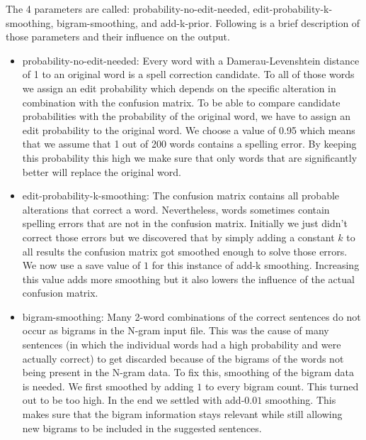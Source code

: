 \documentclass[11pt,a4paper]{article}
\begin{document}
The 4 parameters are called: probability-no-edit-needed, edit-probability-k-smoothing, bigram-smoothing, and add-k-prior. Following is a brief description of those parameters and their influence on the output.
\begin{itemize}
\item probability-no-edit-needed: Every word with a Damerau-Levenshtein distance of 1 to an original word is a spell correction candidate. To all of those words we assign an edit probability which depends on the specific alteration in combination with the confusion matrix. To be able to compare candidate probabilities with the probability of the original word, we have to assign an edit probability to the original word. We choose a value of 0.95 which means that we assume that 1 out of 200 words contains a spelling error. By keeping this probability this high we make sure that only words that are significantly better will replace the original word.

\item edit-probability-k-smoothing: The confusion matrix contains all probable alterations that correct a word. Nevertheless, words sometimes contain spelling errors that are not in the confusion matrix. Initially we just didn't correct those errors but we discovered that by simply adding a constant $k$ to all results the confusion matrix got smoothed enough to solve those errors. We now use a save value of $1$ for this instance of add-k smoothing. Increasing this value adds more smoothing but it also lowers the influence of the actual confusion matrix.

\item bigram-smoothing: Many 2-word combinations of the correct sentences do not occur as bigrams in the N-gram input file. This was the cause of many sentences (in which the individual words had a high probability and were actually correct) to get discarded because of the bigrams of the words not being present in the N-gram data. To fix this, smoothing of the bigram data is needed. We first smoothed by adding $1$ to every bigram count. This turned out to be too high. In the end we settled with add-$0.01$ smoothing. This makes sure that the bigram information stays relevant while still allowing new bigrams to be included in the suggested sentences.


\end{itemize}
\end{document}
